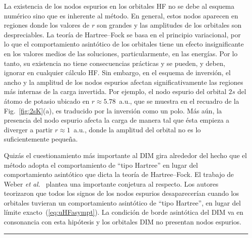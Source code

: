 La existencia de los nodos espurios en los orbitales HF no se debe al 
esquema numérico sino que es inherente al método. En general, estos 
nodos aparecen en regiones donde los valores de
$r$ son grandes y las amplitudes de los orbitales son despreciables.
La teoría de Hartree--Fock se basa en el principio variacional, por lo 
que el comportamiento asintótico de los orbitales tiene un efecto 
insignificante en los valores medios de las soluciones, particularmente, 
en las energías. Por lo tanto, su existencia no tiene consecuencias 
prácticas y se pueden, y deben, ignorar en cualquier cálculo HF. 
Sin embargo, en el esquema de inversión, el ancho y la amplitud de los 
nodos espurios afectan significativamente las regiones más internas de 
la carga invertida. Por ejemplo, el nodo espurio del orbital $2s$ del 
átomo de potasio ubicado en $r\approx 5.78$~a.u., que se muestra en el 
recuadro de la Fig.~\ref{fig:2sK}(a), es traducido por la inversión como
un polo. Más aún, la presencia del nodo espurio afecta la carga de 
manera tal que ésta empieza a diverger a partir $r\approx 1$~a.u., donde 
la amplitud del orbital no es lo suficientemente pequeña. 

Quizás el cuestionamiento más importante al DIM gira alrededor del hecho 
que el método adopta el comportamiento de ``tipo Hartree'' en lugar del 
comportamiento asintótico que dicta la teoría de Hartree--Fock. El 
trabajo de Weber \textit{et al.}~\cite{Weber:70} plantea una importante 
conjetura al respecto. Los autores teorizaron que todos los signos de 
los nodos espurios desaparecerían cuando los orbitales tuvieran un 
comportamiento asintótico de ``tipo Hartree'', en lugar del límite 
exacto~(\ref{eq:uHFasympt}). La condición de borde asintótica del DIM 
va en consonancia con esta hipótesis y los orbitales DIM no presentan 
nodos espurios.

\begin{center}
\rule[0.5ex]{0.8\linewidth}{0.5pt}
\end{center}

